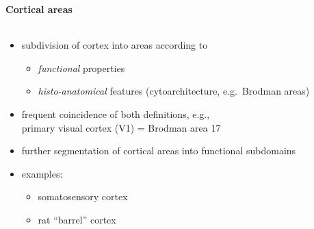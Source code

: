 \documentclass[8pt,t,usepdftitle=false]{beamer}
\def\figpath{\src/figures}
\begin{document}
\begin{frame}[plain]
  \frametitle{\ttl}
  \framesubtitle{Cortical areas}
  \begin{columns}
    \begin{column}{0.5\linewidth}
      \vspace*{-3ex}
      \begin{itemize}\itemsep1ex
      \item subdivision of cortex into areas according to
        \begin{itemize}\itemsep1ex
        \item \emph{functional} properties
        \item \emph{histo-anatomical} features (cytoarchitecture, e.g.~Brodman areas)
        \end{itemize}
      \item frequent coincidence of both definitions,
        e.g.,\\ primary visual cortex (V1) = Brodman area 17
      \item<2-> further segmentation of cortical areas into functional subdomains
      \item<2->[] examples:
        \begin{itemize}\itemsep1ex
        \item somatosensory cortex
        \item rat ``barrel'' cortex
        \end{itemize}
      \end{itemize}
      \vspace{1ex}
    \end{column}
    \begin{column}{0.5\linewidth}
      \begin{center}
\end{center}
\end{column}
\end{columns}
\end{frame}
\end{document}
